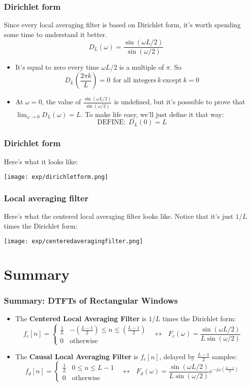 \documentclass{beamer}
\begin{document}
\begin{frame}
  \frametitle{Dirichlet form}

  Since every local averaging filter is based on Dirichlet form, it's
  worth spending some time to understand it better.
  \[
  D_L(\omega) = \frac{\sin(\omega L/2)}{\sin(\omega/2)}
  \]
  \begin{itemize}
  \item It's equal to zero every time $\omega L/2$ is a multiple of $\pi$.  So
    \[
    D_L\left(\frac{2\pi k}{L}\right)  = 0~~\mbox{for all integers}~k~\mbox{except}~k=0
    \]
  \item At $\omega=0$, the value of $\frac{\sin(\omega
    L/2)}{\sin(\omega/2)}$ is undefined, but it's posssible to prove
    that $\lim_{\omega\rightarrow 0}D_L(\omega)=L$.  To make life
    easy, we'll just define it that way:
    \[
    \mbox{DEFINE:}~~D_L(0)=L
    \]
  \end{itemize}
\end{frame}

\begin{frame}
  \frametitle{Dirichlet form}

  Here's what it looks like:
  \centerline{\texttt{[image: exp/dirichletform.png]}}
\end{frame}
  
\begin{frame}
  \frametitle{Local averaging filter}

  Here's what the centered local averaging filter looks like.  Notice that
  it's just $1/L$ times the Dirichlet form:
  \centerline{\texttt{[image: exp/centeredaveragingfilter.png]}}
\end{frame}
  

\section[Summary]{Summary}
\setcounter{subsection}{1}

\begin{frame}
  \frametitle{Summary: DTFTs of Rectangular Windows}
  \begin{itemize}
  \item The {\bf Centered Local Averaging Filter} is $1/L$ times
    the Dirichlet form:
    \[
    f_c[n] = \begin{cases}
      \frac{1}{L} & -\left(\frac{L-1}{2}\right)\le n\le \left(\frac{L-1}{2}\right)\\
      0 & \mbox{otherwise}
    \end{cases}~~~\leftrightarrow~~~
    F_c(\omega)=\frac{\sin(\omega L/2)}{L\sin(\omega/2)}
    \]
  \item The {\bf Causal Local Averaging Filter} is $f_c[n]$, delayed by $\frac{L-1}{2}$ samples:
    \[
    f_d[n] = \begin{cases}
      \frac{1}{L} & 0\le n\le L-1\\
      0 & \mbox{otherwise}
    \end{cases}~~~\leftrightarrow~~~
    F_d(\omega)=\frac{\sin(\omega L/2)}{L\sin(\omega/2)}e^{-j\omega\left(\frac{L-1}{2}\right)}
    \]
  \end{itemize}
\end{frame}
\end{document}
